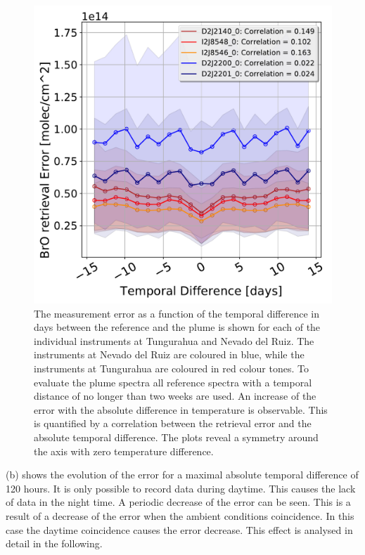 \begin{figure}
	\centering
	\includegraphics[width=0.7\linewidth]{Bilder/DatallInstruments}
	\caption{The  measurement error as a function of the temporal difference in days between the reference and the plume is shown for each of the individual instruments at Tungurahua and Nevado del Ruiz. The instruments at Nevado del Ruiz are coloured in blue, while the instruments at Tungurahua are coloured in red colour tones.  To evaluate the plume spectra all reference spectra with a temporal distance of no longer than two weeks are used. An increase of the  error with the absolute difference in temperature is observable. This is quantified by a correlation between the  retrieval error and the absolute temporal difference. The plots reveal a symmetry around the axis with zero temperature difference.}
	\label{fig:datallinstruments}
\end{figure}
%
 (b) shows the evolution of the  error for a maximal absolute temporal difference of 120 hours. It is only possible to record data during daytime. This causes the lack of data in the night time. A periodic decrease of the  error can be seen. This is a result of a decrease of the  error when the ambient conditions coincidence. In this case the daytime coincidence causes the   error decrease. This effect is analysed in detail in the following.


